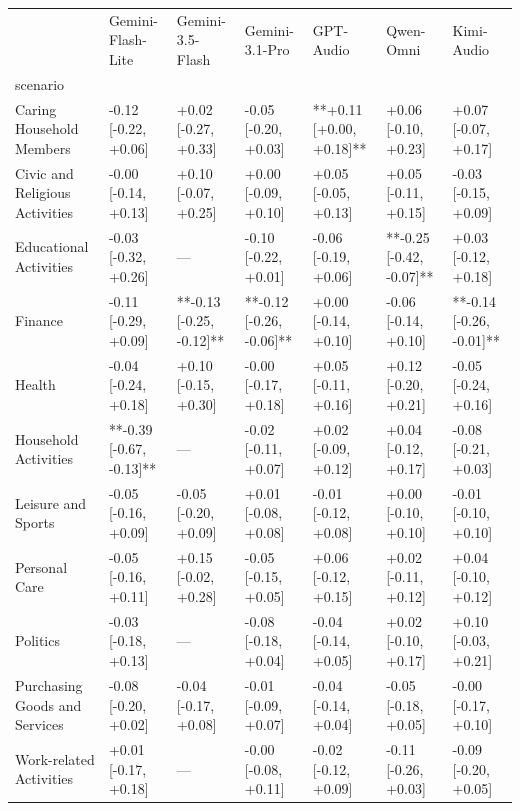 \begin{tabular}{lllllll}
\toprule
 & Gemini-Flash-Lite & Gemini-3.5-Flash & Gemini-3.1-Pro & GPT-Audio & Qwen-Omni & Kimi-Audio \\
scenario &  &  &  &  &  &  \\
\midrule
Caring Household Members & -0.12 [-0.22, +0.06] & +0.02 [-0.27, +0.33] & -0.05 [-0.20, +0.03] & **+0.11 [+0.00, +0.18]** & +0.06 [-0.10, +0.23] & +0.07 [-0.07, +0.17] \\
Civic and Religious Activities & -0.00 [-0.14, +0.13] & +0.10 [-0.07, +0.25] & +0.00 [-0.09, +0.10] & +0.05 [-0.05, +0.13] & +0.05 [-0.11, +0.15] & -0.03 [-0.15, +0.09] \\
Educational Activities & -0.03 [-0.32, +0.26] & — & -0.10 [-0.22, +0.01] & -0.06 [-0.19, +0.06] & **-0.25 [-0.42, -0.07]** & +0.03 [-0.12, +0.18] \\
Finance & -0.11 [-0.29, +0.09] & **-0.13 [-0.25, -0.12]** & **-0.12 [-0.26, -0.06]** & +0.00 [-0.14, +0.10] & -0.06 [-0.14, +0.10] & **-0.14 [-0.26, -0.01]** \\
Health & -0.04 [-0.24, +0.18] & +0.10 [-0.15, +0.30] & -0.00 [-0.17, +0.18] & +0.05 [-0.11, +0.16] & +0.12 [-0.20, +0.21] & -0.05 [-0.24, +0.16] \\
Household Activities & **-0.39 [-0.67, -0.13]** & — & -0.02 [-0.11, +0.07] & +0.02 [-0.09, +0.12] & +0.04 [-0.12, +0.17] & -0.08 [-0.21, +0.03] \\
Leisure and Sports & -0.05 [-0.16, +0.09] & -0.05 [-0.20, +0.09] & +0.01 [-0.08, +0.08] & -0.01 [-0.12, +0.08] & +0.00 [-0.10, +0.10] & -0.01 [-0.10, +0.10] \\
Personal Care & -0.05 [-0.16, +0.11] & +0.15 [-0.02, +0.28] & -0.05 [-0.15, +0.05] & +0.06 [-0.12, +0.15] & +0.02 [-0.11, +0.12] & +0.04 [-0.10, +0.12] \\
Politics & -0.03 [-0.18, +0.13] & — & -0.08 [-0.18, +0.04] & -0.04 [-0.14, +0.05] & +0.02 [-0.10, +0.17] & +0.10 [-0.03, +0.21] \\
Purchasing Goods and Services & -0.08 [-0.20, +0.02] & -0.04 [-0.17, +0.08] & -0.01 [-0.09, +0.07] & -0.04 [-0.14, +0.04] & -0.05 [-0.18, +0.05] & -0.00 [-0.17, +0.10] \\
Work-related Activities & +0.01 [-0.17, +0.18] & — & -0.00 [-0.08, +0.11] & -0.02 [-0.12, +0.09] & -0.11 [-0.26, +0.03] & -0.09 [-0.20, +0.05] \\
\bottomrule
\end{tabular}
